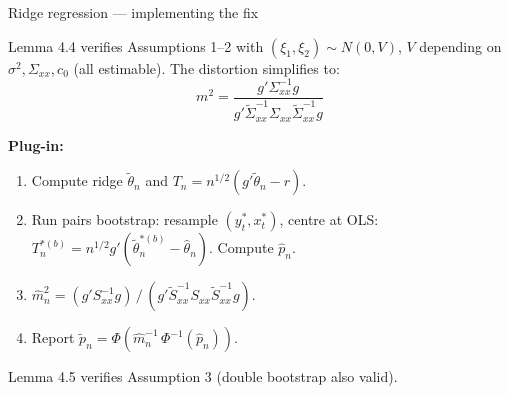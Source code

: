 \documentclass[10pt,aspectratio=169]{beamer}
\theoremstyle{plain}
\newcommand{\Tn}{T_{n}}
\newcommand{\pnh}{\hat{p}_{n}}
\newcommand{\pnt}{\tilde{p}_{n}}
\begin{document}
\begin{frame}{Ridge regression --- implementing the fix}

  Lemma 4.4 verifies Assumptions 1--2 with $(\xi_1, \xi_2) \sim N(0,V)$,
  $V$ depending on $\sigma^2, \Sigma_{xx}, c_0$ (all estimable).
  The distortion simplifies to:
  \[
    m^2 = \frac{g'\Sigma_{xx}^{-1}g}
               {g'\tilde\Sigma_{xx}^{-1}\Sigma_{xx}\tilde\Sigma_{xx}^{-1}g}
  \]

  \textbf{Plug-in:}
  \begin{enumerate}
    \setlength{\itemsep}{6pt}
    \item Compute ridge $\tilde\theta_n$ and $\Tn = n^{1/2}(g'\tilde\theta_n - r)$.
    \item Run pairs bootstrap: resample $(y_t^*, x_t^*)$, centre at OLS:
      $T_n^{*(b)} = n^{1/2}g'(\tilde\theta_n^{*(b)} - \hat\theta_n)$.
      Compute $\pnh$.
    \item $\hat{m}_n^2 = (g'S_{xx}^{-1}g)\,/\,(g'\tilde{S}_{xx}^{-1}S_{xx}\tilde{S}_{xx}^{-1}g)$.
    \item Report $\pnt = \Phi(\hat{m}_n^{-1}\,\Phi^{-1}(\pnh))$.
  \end{enumerate}

  \medskip

  Lemma 4.5 verifies Assumption 3 (double bootstrap also valid).

  
\end{frame}

\end{document}
